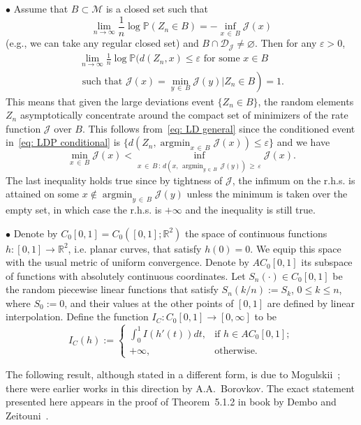 \documentclass[10pt]{amsart}
\theoremstyle{definition}\newtheorem{defi}[theo]{Definition}\newtheorem{rema}[theo]{Remark}\newtheorem{exam}[theo]{Example}\newtheorem{exem}[theo]{Example}\newtheorem{nota}[theo]{Notation}
\newcommand{\Rbb}{\mathbb{R}}
\newcommand{\Pbb}{\mathbb{P}}
\newcommand{\Dcl}{\mathcal{D}}
\newcommand{\Jcl}{\mathcal{J}}
\newcommand{\Mcl}{\mathcal{M}}
\newcommand{\argmin}{\mathop{\mathrm{argmin}}\nolimits}
\begin{document}
$\bullet$ Assume that $B \subset \Mcl$ is a closed set such that
\[
\lim_{n\to\infty} \frac1n \log \Pbb\left(Z_n\in B\right) =-\inf_{x\,\in\,B}\Jcl(x)
\]
(e.g., we can take any regular closed set) and $B \cap \Dcl_{\Jcl} \neq \varnothing$. Then for any $\varepsilon >0$,
\begin{multline}\label{eq: LDP conditional}
\lim_{n\to\infty}\frac1n\log \Pbb\Big(d(Z_n,x) \le \varepsilon \text{ for some } x \in B \\
\left.\text{ such that } \Jcl(x) = \min_{y\,\in\,B} \Jcl(y) \Big|  Z_n \in B \right) =1. 
\end{multline}
This means that given the large deviations event $\{Z_n \in B\}$, the random elements $Z_n$ asymptotically concentrate around the compact set of minimizers of the rate function $\Jcl$ over $B$. This follows from~\eqref{eq: LD general} since the conditioned event in~\eqref{eq: LDP conditional} is $\{d(Z_n, \argmin_{x\,\in\,B} \Jcl(x)) \le\varepsilon \big\}$ and we have
\[
\min_{x\,\in\,B} \Jcl(x) < \inf_{x\,\in\,B\,: \, d\left(x,\, \argmin_{y\,\in\,B}\,\Jcl(y)\right)\,\ge\,\varepsilon} \Jcl(x).
\]
The last inequality holds true since by tightness of $ \Jcl$, the infimum on the r.h.s. is attained on some $x \not \in \argmin_{y\,\in\,B} \Jcl(y)$ unless the minimum is taken over the empty set, in which case the r.h.s. is $+\infty$ and the inequality is still true.

$\bullet$ Denote by $C_0[0,1]=C_0([0,1];\Rbb^2)$ the space of continuous functions $h:[0,1] \to \Rbb^2$, i.e. planar curves, that satisfy $h(0)=0$. We equip this space with the usual metric of uniform convergence. Denote by $AC_0[0,1]$ its subspace of functions with absolutely continuous coordinates. Let $S_n(\cdot) \in C_0[0,1]$ be the random piecewise linear functions that satisfy $S_n(k/n):=S_k$, $0 \le k \le n$, where $S_0:=0$, and their values at the other points of $[0,1]$ are defined by linear interpolation. Define the function $I_C: C_0[0,1] \to [0, \infty]$ to be
\begin{equation}\label{eq: I def}
I_C(h):=
\begin{cases}
\int_0^1 I(h'(t)) dt, & \text{if } h \in AC_0[0,1]; \\
+\infty, & \text{otherwise}.
\end{cases}
\end{equation}

The following result, although stated in a different form, is due to Mogulskii~\cite[Theorem~2, Part II]{Mogulskii}; there were earlier works in this direction by A.A.\ Borovkov. The exact statement presented here appears in the proof of Theorem~5.1.2 in book by Dembo and Zeitouni~\cite{DemboZeitouni}.
\end{document}
